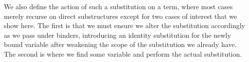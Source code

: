 We also define the action of such a substitution on a term, where most cases
merely recurse on direct substructures except for two cases of
interest that we show here. The first is that we must ensure we alter the
substitution accordingly as we pass under binders, introducing an identity
substitution for the newly bound variable after weakening the scope of
the substitution we already have. The second is where we find some variable
and perform the actual substitution.
\begin{code}%
\>[0]\AgdaSpace{}%
\AgdaSymbol{:}\AgdaSpace{}%
\AgdaSpace{}%
\AgdaSpace{}%
\AgdaSpace{}%
\AgdaSpace{}%
\AgdaSpace{}%
\AgdaSpace{}%
\AgdaSpace{}%
\AgdaSpace{}%
\AgdaSpace{}%
\AgdaSpace{}%
\<%
\\
\>[0]\AgdaSpace{}%
\AgdaSymbol{\{}\AgdaSymbol{\}}\AgdaSpace{}%
\AgdaSymbol{(}\AgdaSpace{}%
\AgdaSymbol{)}%
\>[28]%
\>[31]\AgdaSymbol{=}\AgdaSpace{}%
\AgdaSpace{}%
\AgdaSymbol{(}\AgdaSpace{}%
\AgdaSpace{}%
\AgdaSymbol{(}\AgdaSpace{}%
\AgdaOperator{\AgdaFunction{\textasciicircum{}}}\AgdaSpace{}%
\AgdaOperator{\AgdaInductiveConstructor{-,}}\AgdaSpace{}%
\AgdaSpace{}%
\AgdaSymbol{))}\<%
\\
\>[0]\AgdaSpace{}%
\AgdaSymbol{\{}\AgdaSymbol{\}}\AgdaSpace{}%
\AgdaSymbol{(}\AgdaSpace{}%
\AgdaSymbol{)}%
\>[28]%
\>[31]\AgdaSymbol{=}\AgdaSpace{}%
\AgdaSpace{}%
\AgdaSymbol{(}\AgdaSpace{}%
\AgdaSymbol{)}\AgdaSpace{}%
\AgdaSpace{}%
\<%
\end{code}
